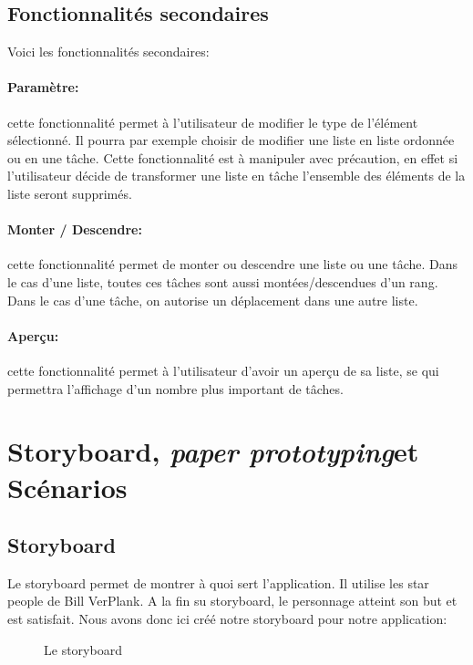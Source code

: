 \documentclass[a4paper,10pt]{article}
\newcommand{\paperPrototyping}{\emph{paper prototyping}}
\begin{document}
\subsection{Fonctionnalités secondaires}
Voici les fonctionnalités secondaires:
\paragraph{Paramètre:} cette fonctionnalité permet à l'utilisateur de modifier le type de l'élément sélectionné. Il pourra par exemple choisir de modifier une liste en liste ordonnée ou en une tâche. Cette fonctionnalité est à manipuler avec précaution, en effet si l'utilisateur décide de transformer une liste en tâche l'ensemble des éléments de la liste seront supprimés. %
\paragraph{Monter / Descendre:} cette fonctionnalité permet de monter ou descendre une liste ou une tâche. Dans le cas d'une liste, toutes ces tâches sont aussi montées/descendues d'un rang. Dans le cas d'une tâche, on autorise un déplacement dans une autre liste. %
\paragraph{Aperçu:} cette fonctionnalité permet à l'utilisateur d'avoir un aperçu de sa liste, se qui permettra l'affichage d'un nombre plus important de tâches. %

\newpage
\section{Storyboard, \paperPrototyping et Scénarios}

\subsection{Storyboard}
Le storyboard permet de montrer à quoi sert l'application. Il utilise les star people de Bill VerPlank. A la fin su storyboard, le personnage atteint son but et est satisfait. Nous avons donc ici créé notre storyboard pour notre application:
\begin{figure}[H]
    \center
    \caption{Le storyboard}
\end{figure}
\end{document}
